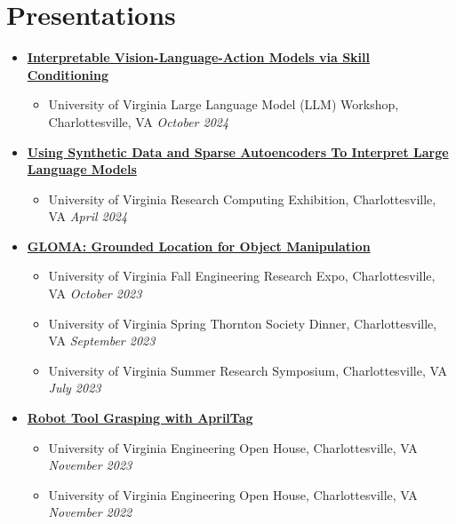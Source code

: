 \documentclass[letterpaper,11pt]{article}
\newcommand{\Date}[1]{\textit{\small #1}}
\begin{document}
\section{Presentations}
\begin{itemize}
  \item {\href{https://www.brandonyifanyang.com/skillvla.pdf}{\textbf{Interpretable Vision-Language-Action Models via Skill Conditioning}}}
        \begin{itemize}
          \item University of Virginia Large Language Model (LLM) Workshop, Charlottesville, VA \hfill \Date{October 2024}
        \end{itemize}
  \item {\href{https://www.brandonyifanyang.com/MI.pdf}{\textbf{Using Synthetic Data and Sparse Autoencoders To Interpret Large Language Models}}}
        \begin{itemize}
          \item University of Virginia Research Computing Exhibition, Charlottesville, VA \hfill \Date{April 2024}
        \end{itemize}
  \item \href{https://www.brandonyifanyang.com/gloma.pdf}{\textbf{GLOMA: Grounded Location for Object Manipulation}}
        \begin{itemize}
          \item University of Virginia Fall Engineering Research Expo, Charlottesville, VA \hfill \Date{October 2023}
          \item University of Virginia Spring Thornton Society Dinner, Charlottesville, VA \hfill \Date{September 2023}
          \item University of Virginia Summer Research Symposium, Charlottesville, VA \hfill \Date{July 2023}
        \end{itemize}
  \item \href{https://github.com/branyang02/apriltag_detection}{\textbf{Robot Tool Grasping with AprilTag}}
        \begin{itemize}
          \item University of Virginia Engineering Open House, Charlottesville, VA \hfill \Date{November 2023}
          \item University of Virginia Engineering Open House, Charlottesville, VA \hfill \Date{November 2022}
        \end{itemize}
\end{itemize}
\end{document}
